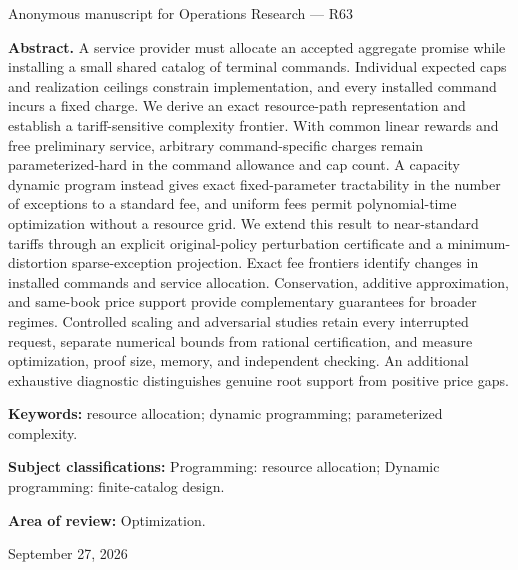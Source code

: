 \documentclass[11pt,letterpaper]{article}
\theoremstyle{definition}\newtheorem{remark}[theorem]{Remark}
\begin{document}
\hypersetup{pageanchor=false}
\begin{titlepage}
\vspace{0.25in}Anonymous manuscript for Operations Research --- R63\par\vspace{0.2in}
\begin{minipage}{\textwidth}\textbf{Abstract.} A service provider must allocate an accepted aggregate promise while installing a small shared catalog of terminal commands. Individual expected caps and realization ceilings constrain implementation, and every installed command incurs a fixed charge. We derive an exact resource-path representation and establish a tariff-sensitive complexity frontier. With common linear rewards and free preliminary service, arbitrary command-specific charges remain parameterized-hard in the command allowance and cap count. A capacity dynamic program instead gives exact fixed-parameter tractability in the number of exceptions to a standard fee, and uniform fees permit polynomial-time optimization without a resource grid. We extend this result to near-standard tariffs through an explicit original-policy perturbation certificate and a minimum-distortion sparse-exception projection. Exact fee frontiers identify changes in installed commands and service allocation. Conservation, additive approximation, and same-book price support provide complementary guarantees for broader regimes. Controlled scaling and adversarial studies retain every interrupted request, separate numerical bounds from rational certification, and measure optimization, proof size, memory, and independent checking. An additional exhaustive diagnostic distinguishes genuine root support from positive price gaps.
\par\vspace{0.15in}\textbf{Keywords:} resource allocation; dynamic programming; parameterized complexity.
\par\vspace{0.1in}\textbf{Subject classifications:} Programming: resource allocation; Dynamic programming: finite-catalog design.
\par\vspace{0.1in}\textbf{Area of review:} Optimization.\end{minipage}\vfill September 27, 2026\end{titlepage}
\hypersetup{pageanchor=true}
\end{document}
